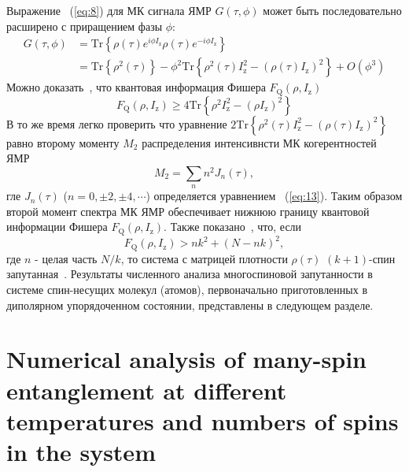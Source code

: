 \documentclass[review]{elsarticle}
\begin{document}
Выражение ~(\ref{eq:8}) для МК сигнала ЯМР $G(\tau,\phi)$ может быть последовательно расширено с приращением фазы $\phi$:
%
\begin{equation}
    \begin{split}
        \label{eq:17}
        G(\tau,\phi)  
        & = \mathrm{Tr} \left\{ 
            \rho(\tau) e^{i \phi I_\mathrm{z} }
            \rho(\tau) e^{-i\phi I_\mathrm{z}}
        \right\}  \\
        & = \mathrm{Tr} \left\{ \rho^2(\tau) \right\} 
        - \phi^2 \mathrm{Tr} \left\{ 
            \rho^2(\tau) I^2_\mathrm{z} 
            - (\rho(\tau) I_\mathrm{z})^2
        \right\} 
        + O(\phi^3)
    \end{split}
\end{equation}
%
Можно доказать~\cite{Girolami_2017}, что квантовая информация Фишера $F_\mathrm{Q}(\rho,I_\mathrm{z})$~\cite{Helstrom_1976}
%
\begin{equation}
    \label{eq:18}
    F_\mathrm{Q}(\rho,I_\mathrm{z}) \geq 4 \mathrm{Tr} \left\{ \rho^2 I^2_\mathrm{z} - (\rho I_\mathrm{z})^2 \right\}
\end{equation}
%
В то же время легко проверить что уравнение $2 \mathrm{Tr} \left\{ \rho^2(\tau) I_\mathrm{z}^2 - \left( \rho(\tau) I_\mathrm{z} \right)^2 \right\}$ равно второму моменту $M_2$ распределения интенсивнсти МК когерентностей ЯМР~\cite{Khitrin_1997}
%
\begin{equation}
    \label{eq:19}
    M_2 = \sum_{n} n^2 J_n (\tau) ,
\end{equation}
%
гле $J_n(\tau)$ ($n=0,\pm 2, \pm 4, \cdots$) определяется уравнением ~(\ref{eq:13}).
Таким образом второй момент спектра МК ЯМР обеспечивает нижнюю границу квантовой информации Фишера $F_\mathrm{Q}(\rho,I_\mathrm{z})$.
Также показано~\cite{T_th_2014,Pezz__2018}, что, если
%
\begin{equation}
    \label{eq:20}
    F_\mathrm{Q} (\rho,I_\mathrm{z}) > n k^2 + (N - n k)^2,
\end{equation}
%
где $n$ - целая часть ${N/k}$, то система с матрицей плотности $\rho(\tau)$ $(k+1)$-спин запутанная~\cite{Pezz__2009,Hyllus_2012,T_th_2012}.
Результаты численного анализа многоспиновой запутанности в системе спин-несущих молекул (атомов), первоначально приготовленных в диполярном упорядоченном состоянии, представлены в следующем разделе.



\section{Numerical analysis of many-spin entanglement at different temperatures and numbers of spins in the system}
\label{sec:5}
\end{document}
